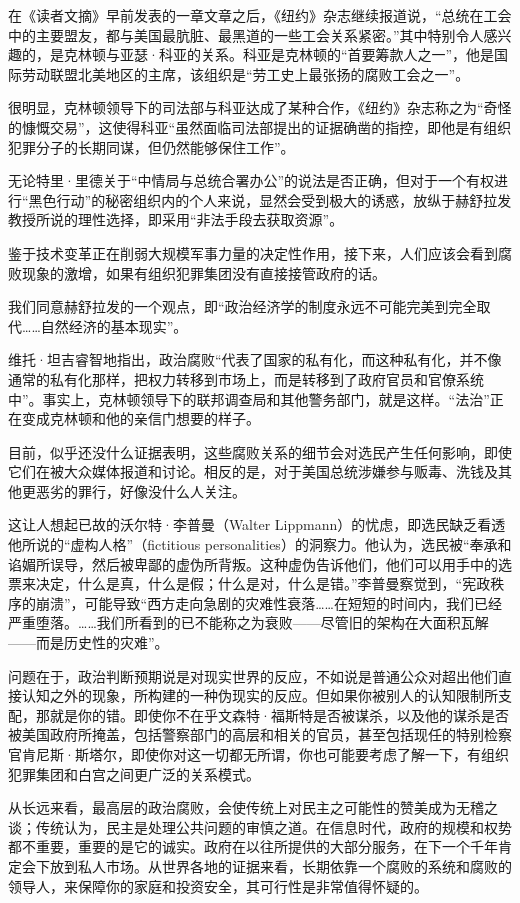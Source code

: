 在《读者文摘》早前发表的一章文章之后，《纽约》杂志继续报道说，“总统在工会中的主要盟友，都与美国最肮脏、最黑道的一些工会关系紧密。”其中特别令人感兴趣的，是克林顿与亚瑟·科亚的关系。科亚是克林顿的“首要筹款人之一”，他是国际劳动联盟北美地区的主席，该组织是“劳工史上最张扬的腐败工会之一”。

很明显，克林顿领导下的司法部与科亚达成了某种合作，《纽约》杂志称之为“奇怪的慷慨交易”，这使得科亚“虽然面临司法部提出的证据确凿的指控，即他是有组织犯罪分子的长期同谋，但仍然能够保住工作”。

无论特里·里德关于“中情局与总统合署办公”的说法是否正确，但对于一个有权进行“黑色行动”的秘密组织内的个人来说，显然会受到极大的诱惑，放纵于赫舒拉发教授所说的理性选择，即采用“非法手段去获取资源”。

鉴于技术变革正在削弱大规模军事力量的决定性作用，接下来，人们应该会看到腐败现象的激增，如果有组织犯罪集团没有直接接管政府的话。

我们同意赫舒拉发的一个观点，即“政治经济学的制度永远不可能完美到完全取代……自然经济的基本现实”。

维托·坦吉睿智地指出，政治腐败“代表了国家的私有化，而这种私有化，并不像通常的私有化那样，把权力转移到市场上，而是转移到了政府官员和官僚系统中”。事实上，克林顿领导下的联邦调查局和其他警务部门，就是这样。“法治”正在变成克林顿和他的亲信门想要的样子。

目前，似乎还没什么证据表明，这些腐败关系的细节会对选民产生任何影响，即使它们在被大众媒体报道和讨论。相反的是，对于美国总统涉嫌参与贩毒、洗钱及其他更恶劣的罪行，好像没什么人关注。

这让人想起已故的沃尔特·李普曼（Walter Lippmann）的忧虑，即选民缺乏看透他所说的“虚构人格”（fictitious personalities）的洞察力。他认为，选民被“奉承和谄媚所误导，然后被卑鄙的虚伪所背叛。这种虚伪告诉他们，他们可以用手中的选票来决定，什么是真，什么是假；什么是对，什么是错。”李普曼察觉到，“宪政秩序的崩溃”，可能导致“西方走向急剧的灾难性衰落……在短短的时间内，我们已经严重堕落。……我们所看到的已不能称之为衰败——尽管旧的架构在大面积瓦解——而是历史性的灾难”。

问题在于，政治判断预期说是对现实世界的反应，不如说是普通公众对超出他们直接认知之外的现象，所构建的一种伪现实的反应。但如果你被别人的认知限制所支配，那就是你的错。即使你不在乎文森特·福斯特是否被谋杀，以及他的谋杀是否被美国政府所掩盖，包括警察部门的高层和相关的官员，甚至包括现任的特别检察官肯尼斯·斯塔尔，即使你对这一切都无所谓，你也可能要考虑了解一下，有组织犯罪集团和白宫之间更广泛的关系模式。

从长远来看，最高层的政治腐败，会使传统上对民主之可能性的赞美成为无稽之谈；传统认为，民主是处理公共问题的审慎之道。在信息时代，政府的规模和权势都不重要，重要的是它的诚实。政府在以往所提供的大部分服务，在下一个千年肯定会下放到私人市场。从世界各地的证据来看，长期依靠一个腐败的系统和腐败的领导人，来保障你的家庭和投资安全，其可行性是非常值得怀疑的。


